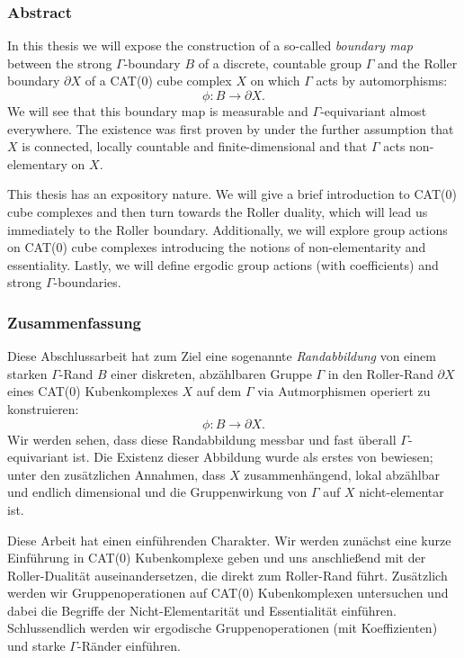 \subsubsection*{Abstract}
%
\label{sec:abstract}

In this thesis we will expose the construction of a so-called \emph{boundary map} between the strong \(\Gamma\)-boundary \(B\) of a discrete, countable group \(\Gamma\) and the Roller boundary \(\partial X\) of a CAT(0) cube complex \(X\) on which \(\Gamma\) acts by automorphisms:
\[
  \phi\colon B \to \partial X.
\]
We will see that this boundary map is measurable and \(\Gamma\)-equivariant almost everywhere. The existence was first proven by \textcite{MR3509968} under the further assumption that \(X\) is connected, locally countable and finite-dimensional and that \(\Gamma\) acts non-elementary on \(X\). 

This thesis has an expository nature. We will give a brief introduction to CAT(0) cube complexes and then turn towards the Roller duality, which will lead us immediately to the Roller boundary. Additionally, we will explore group actions on CAT(0) cube complexes introducing the notions of non-elementarity and essentiality. Lastly, we will define ergodic group actions (with coefficients) and strong \(\Gamma\)-boundaries.


\subsubsection*{Zusammenfassung}
\label{sec:Zusammenfassung}
Diese Abschlussarbeit hat zum Ziel eine sogenannte \emph{Randabbildung} von einem starken \(\Gamma\)-Rand \(B\) einer diskreten, abzählbaren Gruppe \(\Gamma\) in den Roller-Rand \(\partial X\) eines CAT(0) Kubenkomplexes \(X\) auf dem \(\Gamma\) via Autmorphismen operiert zu konstruieren:
\[
  \phi\colon B \to \partial X.
\]
Wir werden sehen, dass diese Randabbildung messbar und fast überall \(\Gamma\)-equivariant ist. Die Existenz dieser Abbildung wurde als erstes von \textcite{MR3509968} bewiesen; unter den zusätzlichen Annahmen, dass \(X\) zusammenhängend, lokal abzählbar und endlich dimensional und die Gruppenwirkung von \(\Gamma\) auf \(X\) nicht-elementar ist.

Diese Arbeit hat einen einführenden Charakter. Wir werden zunächst eine kurze Einführung in CAT(0) Kubenkomplexe geben und uns anschließend mit der Roller-Dualität auseinandersetzen, die direkt zum Roller-Rand führt. Zusätzlich werden wir Gruppenoperationen auf CAT(0) Kubenkomplexen untersuchen und dabei die Begriffe der Nicht-Elementarität und Essentialität einführen. Schlussendlich werden wir ergodische Gruppenoperationen (mit Koeffizienten) und starke \(\Gamma\)-Ränder einführen.


